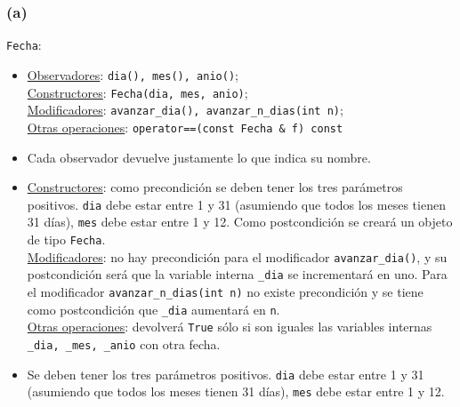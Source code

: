 \documentclass[12 pt]{article}
\begin{document}
    \subsubsection*{(a)}
        \texttt{Fecha}:
        \begin{itemize}
            \item \underline{Observadores}: \texttt{dia(), mes(), anio()}; 
            \\
            \underline{Constructores}: \texttt{Fecha(dia, mes, anio)}; 
            \\
            \underline{Modificadores}: \texttt{avanzar\_dia(), avanzar\_n\_dias(int n)};
            \\
            \underline{Otras operaciones}: \texttt{operator==(const Fecha \& f) const}
            \item Cada observador devuelve justamente lo que indica su nombre.
            \item \underline{Constructores}: como precondición se deben tener los tres parámetros positivos. \texttt{dia} debe estar entre 1 y 31 (asumiendo que todos los meses tienen 31 días), \texttt{mes} debe estar entre 1 y 12. Como postcondición se creará un objeto de tipo \texttt{Fecha}.
            \\
            \underline{Modificadores}: no hay precondición para el modificador \texttt{avanzar\_dia()}, y su postcondición será que la variable interna \texttt{\_dia} se incrementará en uno. Para el modificador \texttt{avanzar\_n\_dias(int n)} no existe precondición y se tiene como postcondición que \texttt{\_dia} aumentará en \texttt{n}.
            \\
            \underline{Otras operaciones}: devolverá \texttt{True} sólo si son iguales las variables internas \texttt{\_dia, \_mes, \_anio} con otra fecha.
            \item Se deben tener los tres parámetros positivos. \texttt{dia} debe estar entre 1 y 31 (asumiendo que todos los meses tienen 31 días), \texttt{mes} debe estar entre 1 y 12.
        \end{itemize}
\end{document}
